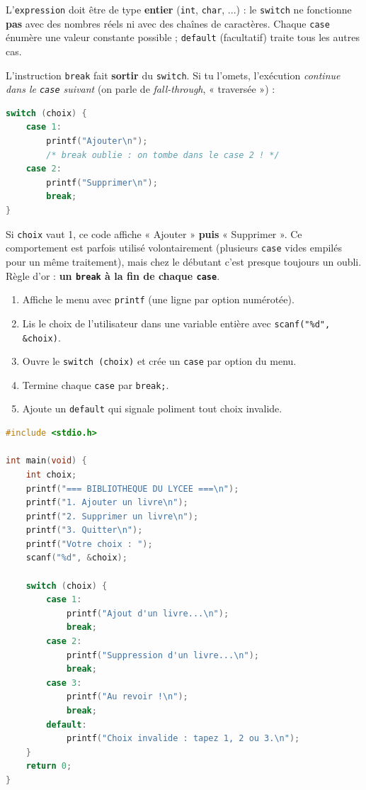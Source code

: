 \documentclass[11pt]{article}
\begin{document}
L'\texttt{expression} doit être de type \textbf{entier} (\texttt{int}, \texttt{char}, ...) : le \texttt{switch} ne fonctionne \textbf{pas} avec des nombres réels ni avec des chaînes de caractères. Chaque \texttt{case} énumère une valeur constante possible ; \texttt{default} (facultatif) traite tous les autres cas.

\begin{attention}
L'instruction \texttt{break} fait \textbf{sortir} du \texttt{switch}. Si tu l'omets, l'exécution \emph{continue dans le \texttt{case} suivant} (on parle de \emph{fall-through}, « traversée ») :
\begin{lstlisting}[language=C]
switch (choix) {
    case 1:
        printf("Ajouter\n");
        /* break oublie : on tombe dans le case 2 ! */
    case 2:
        printf("Supprimer\n");
        break;
}
\end{lstlisting}
Si \texttt{choix} vaut 1, ce code affiche « Ajouter » \textbf{puis} « Supprimer ». Ce comportement est parfois utilisé volontairement (plusieurs \texttt{case} vides empilés pour un même traitement), mais chez le débutant c'est presque toujours un oubli. Règle d'or : \textbf{un \texttt{break} à la fin de chaque \texttt{case}}.
\end{attention}

\begin{methode}
\begin{enumerate}
    \item Affiche le menu avec \texttt{printf} (une ligne par option numérotée).
    \item Lis le choix de l'utilisateur dans une variable entière avec \texttt{scanf("\%d", \&choix)}.
    \item Ouvre le \texttt{switch (choix)} et crée un \texttt{case} par option du menu.
    \item Termine chaque \texttt{case} par \texttt{break;}.
    \item Ajoute un \texttt{default} qui signale poliment tout choix invalide.
\end{enumerate}
\end{methode}

\begin{exemplebox}
\begin{lstlisting}[language=C]
#include <stdio.h>

int main(void) {
    int choix;
    printf("=== BIBLIOTHEQUE DU LYCEE ===\n");
    printf("1. Ajouter un livre\n");
    printf("2. Supprimer un livre\n");
    printf("3. Quitter\n");
    printf("Votre choix : ");
    scanf("%d", &choix);

    switch (choix) {
        case 1:
            printf("Ajout d'un livre...\n");
            break;
        case 2:
            printf("Suppression d'un livre...\n");
            break;
        case 3:
            printf("Au revoir !\n");
            break;
        default:
            printf("Choix invalide : tapez 1, 2 ou 3.\n");
    }
    return 0;
}
\end{lstlisting}
\end{exemplebox}
\end{document}
